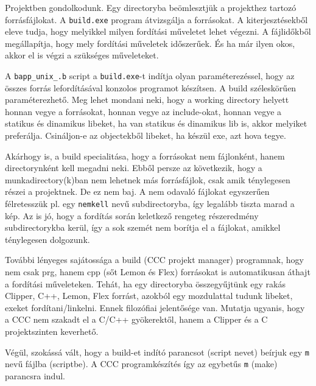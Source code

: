 Projektben gondolkodunk. Egy directoryba beömlesztjük a projekthez tartozó
forrásfájlokat. A \verb!build.exe! program átvizsgálja a forrásokat.
A kiterjesztésekből eleve tudja, hogy melyikkel milyen fordítási
műveletet lehet végezni. A fájlidőkből megállapítja, hogy mely fordítási
műveletek időszerűek. És ha már ilyen okos, akkor el is végzi a szükséges
műveleteket. 

A \verb!bapp_unix_.b! script a \verb!build.exe!-t indítja olyan 
paraméterezéssel, hogy az összes forrás lefordításával konzolos 
programot készítsen. A build széleskörűen paraméterezhető.
Meg lehet mondani neki, hogy a working directory helyett honnan vegye a forrásokat,
honnan vegye az include-okat, honnan vegye a statikus és dinamikus libeket,
ha van statikus és dinamikus lib is, akkor melyiket preferálja. Csináljon-e az 
objectekből libeket, ha készül exe, azt hova tegye. 

Akárhogy is, a build specialitása, 
hogy a forrásokat nem fájlonként, hanem directorynként
kell megadni neki. Ebből persze az következik, hogy a munkadirectory(k)ban nem
lehetnek más forrásfájlok, csak amik ténylegesen részei a projektnek. De ez nem
baj. A nem odavaló fájlokat egyszerűen félretesszük pl. egy \verb!nemkell! nevű
subdirectoryba, így legalább tiszta marad a kép. Az is jó, hogy a fordítás során
keletkező rengeteg részeredmény subdirectorykba kerül, így a sok szemét nem
borítja el a fájlokat, amikkel ténylegesen dolgozunk.

További lényeges sajátossága a build (CCC projekt manager) programnak,
hogy nem csak prg, hanem cpp (sőt Lemon és Flex) forrásokat is automatikusan
áthajt a fordítási műveleteken. Tehát, ha egy directoryba összegyűjtünk egy rakás
Clipper, C++, Lemon, Flex forrást, azokból egy mozdulattal tudunk libeket,
exeket fordítani/linkelni. Ennek filozófiai jelentősége van. Mutatja ugyanis,
hogy a CCC nem szakadt el a C/C++ gyökerektől, hanem a Clipper és a C 
projektszinten keverhető.

Végül, szokássá vált, hogy a build-et indító parancsot (script nevet) beírjuk 
egy \verb!m! nevű fájlba (scriptbe). A CCC programkészítés így az egybetűs 
\verb!m! (make) parancsra indul.








